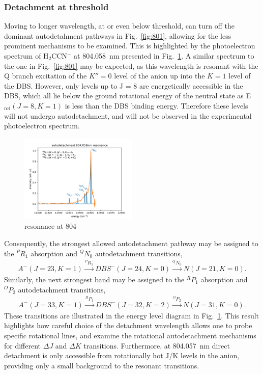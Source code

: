\documentclass[journal=jpcafh,manuscript=article,layout=onecolumn, 12pt]{achemso}
\begin{document}
\subsubsection{Detachment at threshold}
Moving to longer wavelength, at or even below threshold, can turn off the dominant autodetahment pathways in Fig.~\ref{fig:801}, allowing for the less prominent mechanisms to be examined. This is highlighted by the photoelectron spectrum of H$_2$CCN$^-$ at 804.058~nm presented in Fig.~\ref{fig:804}. A similar spectrum to the one in Fig.~\ref{fig:801} may be expected, as this wavelength is resonant with the Q branch excitation of the $K''=0$ level of the anion up into the $K=1$ level of the DBS. However, only levels up to J = 8 are energetically accessible in the DBS, which all lie below the ground rotational energy of the neutral state as E$_{\text{rot}}(J=8,K=1)$ is less than the DBS binding energy. Therefore these levels will not undergo autodetachment, and will not be observed in the experimental photoelectron spectrum.

\begin{figure}
	\includegraphics[width=0.5\textwidth]{scripts/804}
	\caption{resonance at 804}
	\label{fig:804}
\end{figure}

Consequently, the strongest allowed autodetachment pathway may be assigned to the $^PR_1$ absorption and $^QN_0$ autodetachment transitions,
\begin{align*}
	A^-(J = 23, K=1) \xrightarrow{^PR_1} DBS^-(J=24,K=0) \xrightarrow{^QN_0} N(J=21, K=0).
\end{align*}
Similarly, the next strongest band may be assigned to the $^RP_1$ absorption and $^OP_2$ autodetachment transitions,
\begin{align*}
	A^-(J = 33, K=1) \xrightarrow{^RP_1} DBS^-(J=32,K=2) \xrightarrow{^OP_2} N(J=31, K=0).
\end{align*}
These transitions are illustrated in the energy level diagram in Fig.~\ref{fig:804}. This result highlights how careful choice of the detachment wavelength allows one to probe specific rotational lines, and examine the rotational autodetachment mechanisms for different $\Delta J$ and $\Delta K$ transitions. Furthermore, at 804.057~nm direct detachment is only accessible from rotationally hot J/K levels in the anion, providing only a small background to the resonant transitions.
\end{document}
